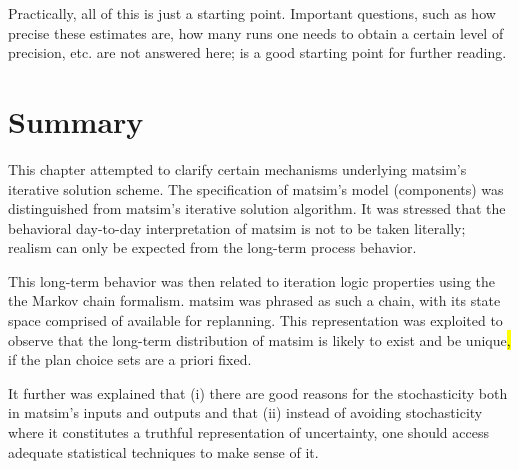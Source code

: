 Practically, all of this is just a starting point. Important questions,
such as how precise these estimates are, how many runs one needs to
obtain a certain level of precision, etc. are not answered here; 
\citet{ross-2006} is a good starting point for further reading. 


\section{\label{sec:Summary}Summary}

This chapter attempted to clarify certain mechanisms underlying \gls{matsim}'s
iterative solution scheme. The specification of \gls{matsim}'s model (components)
was distinguished from \gls{matsim}'s iterative solution algorithm. It was
stressed that the behavioral day-to-day interpretation of \gls{matsim} is
not to be taken literally; realism can only be expected from the long-term
process behavior.

This long-term behavior was then related to iteration logic properties  
using the the Markov chain formalism. \gls{matsim} was phrased as
such a chain, with its state space comprised of  available for replanning. This representation was exploited to
observe that the long-term distribution of \gls{matsim} is likely to exist
and be unique\hl{,} if the plan choice sets are a priori fixed.

It further was explained that (i) there are good reasons for the stochasticity
both in \gls{matsim}'s inputs and outputs and that (ii) instead of avoiding
stochasticity where it constitutes a truthful representation of uncertainty,
one should access adequate statistical techniques to make sense of
it. 

